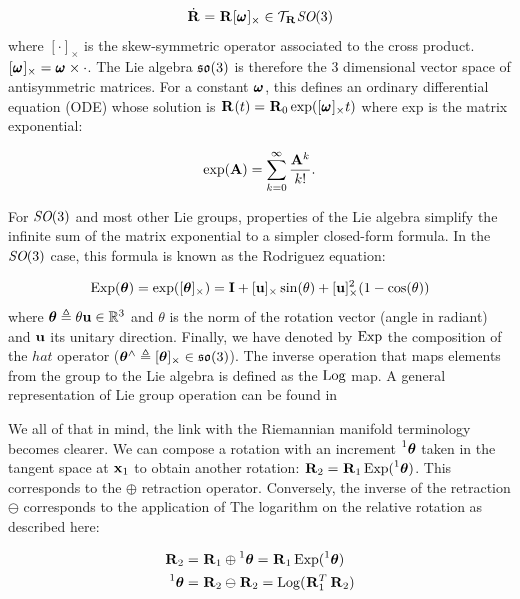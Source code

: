 \begin{equation}
    \dot{\prescript{}{}{{\bf R}}_{}} = \prescript{}{}{{\bf R}}_{} [\prescript{}{}{\pmb{\omega}}_{}]_{\times} \in \mathcal{T}_{\prescript{}{}{{\bf R}}_{}}\textit{SO}(3)    
\end{equation}
where $[\cdot]_{\times}$ is the skew-symmetric operator associated to the cross product. 
\mbox{$[\prescript{}{}{\pmb{\omega}}_{}]_{\times} = \prescript{}{}{\pmb{\omega}}_{} \times \cdot$}. The Lie algebra ${\mathfrak {so}}(3)$ is therefore the 3 dimensional vector space of antisymmetric matrices.
For a constant $\prescript{}{}{\pmb{\omega}}_{}$, this defines an ordinary differential equation (ODE) whose solution
is $\prescript{}{}{{\bf R}}_{}(t)=\prescript{}{}{{\bf R}}_{0}\exp([\prescript{}{}{\pmb{\omega}}_{}]_{\times}t)$ where exp is the matrix exponential:

\begin{equation}
    \exp({\bf A}) = \sum_{k=0}^{\infty} \frac{{\bf A}^k}{k!}.
\end{equation}

For $\textit{SO}(3)$ and most other Lie groups, properties of the Lie algebra simplify the infinite sum of the matrix exponential to a simpler closed-form formula. 
In the $\textit{SO}(3)$ case, this formula is known as the Rodriguez equation:

\begin{equation}
    \operatorname*{Exp}({\bm \theta}) = \exp([{\bm \theta}]_{\times}) = {\bf I} + [{\bf u}]_{\times}\sin(\theta) + [{\bf u}]_{\times}^2(1 - \cos(\theta))
\end{equation}
where ${\bm \theta} \triangleq \theta {\bf u} \in \mathbb{R}^3$ and $\theta$ is the norm of the rotation vector (angle in radiant) and ${\bf u}$ its unitary direction.
Finally, we have denoted by $\operatorname*{Exp}$ the composition of the $hat$ operator (${\bm \theta}^\wedge \triangleq [{\bm \theta}]_{\times} \in {\mathfrak {so}}(3)$). 
The inverse operation that maps elements from the group to the Lie algebra is defined as the $\operatorname*{Log}$ map. A general representation of
Lie group operation can be found in 

We all of that in mind, the link with the Riemannian manifold terminology becomes clearer. We can compose a rotation with
an increment $\prescript{1}{}{{\bm \theta}}$ taken in the tangent space at ${\bf x}_1$ to obtain another rotation: $\prescript{}{}{{\bf R}}_{2} = \prescript{}{}{{\bf R}}_{1}\operatorname*{Exp}(\prescript{1}{}{{\bm \theta}})$.
This corresponds to the $\oplus$ retraction operator. Conversely, the inverse of the retraction $\ominus$ corresponds to the application of The
logarithm on the relative rotation as described here:

\begin{align}
    \Rot{}{2} &= \Rot{}{1}\oplus \prescript{1}{}{\bftheta} = \Rot{}{1} \Exp(\prescript{1}{}{\bftheta})  \\ 
    \prescript{1}{}{\bftheta} &= \Rot{}{2}\ominus \Rot{}{2} = \Log(\Rot{}{1}^T\Rot{}{2}) 
\end{align}

